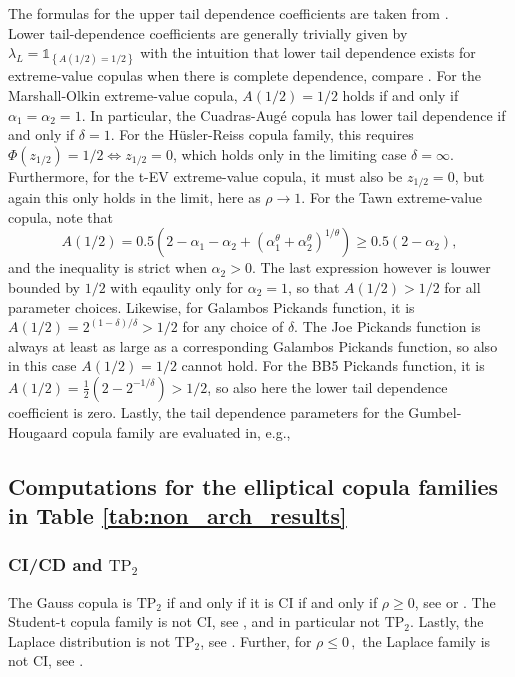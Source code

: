 \documentclass{article}
\def\1{\mathds{1}} %
\def\of#1{\left(#1\right)} %
\def\inbrackets#1{\of{#1}} %
\def\setof#1{\left\{#1\right\}} %
\newcommand{\TP}{\mathrm{TP_2}}
\begin{document}
The formulas for the upper tail dependence coefficients are taken from \cite[Table 3.2]{eschenburg2013properties}. \\
Lower tail-dependence coefficients are generally trivially given by $\lambda_L = \1_{\setof{A(1/2)=1/2}}$ with the intuition that lower tail dependence exists for extreme-value copulas when there is complete dependence, compare \cite[Section 6.4]{jaworski2010copula}.
For the Marshall-Olkin extreme-value copula, $A(1/2)=1/2$ holds if and only if $\alpha_1=\alpha_2=1$.
In particular, the Cuadras-Augé copula has lower tail dependence if and only if $\delta=1$.
For the Hüsler-Reiss copula family, this requires $\Phi(z_{1/2}) = 1/2 \Leftrightarrow z_{1/2} = 0$, which holds only in the limiting case $\delta = \infty$.
Furthermore, for the t-EV extreme-value copula, it must also be $z_{1/2} = 0$, but again this only holds in the limit, here as $\rho\rightarrow 1$.
For the Tawn extreme-value copula, note that
\[
    A(1/2)
    = 0.5\inbrackets{2 - \alpha_1 - \alpha_2 + \inbrackets{\alpha_1^\theta + \alpha_2^\theta}^{1/\theta}}
    \geq 0.5\inbrackets{2 - \alpha_2}
,\]
and the inequality is strict when $\alpha_2>0$.
The last expression however is louwer bounded by $1/2$ with eqaulity only for $\alpha_2 = 1$, so that $A(1/2)>1/2$ for all parameter choices.
Likewise, for Galambos Pickands function, it is $A(1/2) = 2^{(1 - \delta)/\delta} > 1/2$ for any choice of $\delta$.
The Joe Pickands function is always at least as large as a corresponding Galambos Pickands function, so also in this case $A(1/2) = 1/2$ cannot hold.
For the BB5 Pickands function, it is $A(1/2) = \frac12(2 - 2^{-1/\delta}) > 1/2$, so also here the lower tail dependence coefficient is zero.
Lastly, the tail dependence parameters for the Gumbel-Hougaard copula family are evaluated in, e.g., \cite[Example 4.12]{Nelsen-2006}

\subsection{Computations for the elliptical copula families in Table \ref{tab:non_arch_results}}
\label{subsec:elliptical_copula_families}

\subsubsection{CI/CD and $\TP$}
\label{subsubsec:elliptical_ci_and_TP2}

The Gauss copula is $\TP$ if and only if it is CI if and only if $\rho\geq 0$, see \cite[Theorem 2 and 3]{Rueschendorf-1981b} or \cite[Theorem 3.6]{Mueller-Scarsini-2001}.
The Student-t copula family is not CI, see \cite[Proposition 4.3]{rossell2021dependence}, and in particular not $\TP$.
Lastly, the Laplace distribution is not $\TP$, see \cite[Theorem 4.9 and below]{rossell2021dependence}.
Further, for \(\rho\leq 0\,,\) the Laplace family is not CI, see \cite[Remark 4.1 and Theorem 4.2]{rossell2021dependence}.
\end{document}
